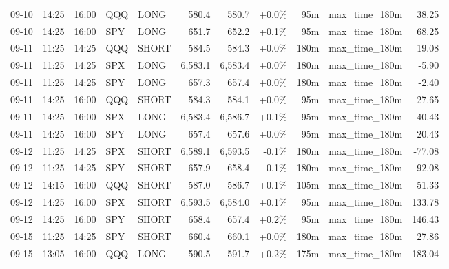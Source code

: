 \documentclass[11pt,a4paper,twoside]{article}
\begin{document}
\begin{center}
\begin{longtable}{>{\color{txtmain}}l l l l l r r r r >{\color{txtmain}}l r}
09-10 & 14:25 & 16:00 & QQQ & LONG & 580.4 & 580.7 & \textcolor{wingreen}{+0.0\%} & 95m & max\_time\_180m & \textcolor{wingreen}{38.25} \\
09-10 & 14:25 & 16:00 & SPY & LONG & 651.7 & 652.2 & \textcolor{wingreen}{+0.1\%} & 95m & max\_time\_180m & \textcolor{wingreen}{68.25} \\
09-11 & 11:25 & 14:25 & QQQ & SHORT & 584.5 & 584.3 & \textcolor{wingreen}{+0.0\%} & 180m & max\_time\_180m & \textcolor{wingreen}{19.08} \\
09-11 & 11:25 & 14:25 & SPX & LONG & 6,583.1 & 6,583.4 & \textcolor{wingreen}{+0.0\%} & 180m & max\_time\_180m & \textcolor{lossred}{-5.90} \\
09-11 & 11:25 & 14:25 & SPY & LONG & 657.3 & 657.4 & \textcolor{wingreen}{+0.0\%} & 180m & max\_time\_180m & \textcolor{lossred}{-2.40} \\
09-11 & 14:25 & 16:00 & QQQ & SHORT & 584.3 & 584.1 & \textcolor{wingreen}{+0.0\%} & 95m & max\_time\_180m & \textcolor{wingreen}{27.65} \\
09-11 & 14:25 & 16:00 & SPX & LONG & 6,583.4 & 6,586.7 & \textcolor{wingreen}{+0.1\%} & 95m & max\_time\_180m & \textcolor{wingreen}{40.43} \\
09-11 & 14:25 & 16:00 & SPY & LONG & 657.4 & 657.6 & \textcolor{wingreen}{+0.0\%} & 95m & max\_time\_180m & \textcolor{wingreen}{20.43} \\
09-12 & 11:25 & 14:25 & SPX & SHORT & 6,589.1 & 6,593.5 & \textcolor{lossred}{-0.1\%} & 180m & max\_time\_180m & \textcolor{lossred}{-77.08} \\
09-12 & 11:25 & 14:25 & SPY & SHORT & 657.9 & 658.4 & \textcolor{lossred}{-0.1\%} & 180m & max\_time\_180m & \textcolor{lossred}{-92.08} \\
09-12 & 14:15 & 16:00 & QQQ & SHORT & 587.0 & 586.7 & \textcolor{wingreen}{+0.1\%} & 105m & max\_time\_180m & \textcolor{wingreen}{51.33} \\
09-12 & 14:25 & 16:00 & SPX & SHORT & 6,593.5 & 6,584.0 & \textcolor{wingreen}{+0.1\%} & 95m & max\_time\_180m & \textcolor{wingreen}{133.78} \\
09-12 & 14:25 & 16:00 & SPY & SHORT & 658.4 & 657.4 & \textcolor{wingreen}{+0.2\%} & 95m & max\_time\_180m & \textcolor{wingreen}{146.43} \\
09-15 & 11:25 & 14:25 & SPY & SHORT & 660.4 & 660.1 & \textcolor{wingreen}{+0.0\%} & 180m & max\_time\_180m & \textcolor{wingreen}{27.86} \\
09-15 & 13:05 & 16:00 & QQQ & LONG & 590.5 & 591.7 & \textcolor{wingreen}{+0.2\%} & 175m & max\_time\_180m & \textcolor{wingreen}{183.04} \\

\end{longtable}
\end{center}
\end{document}
